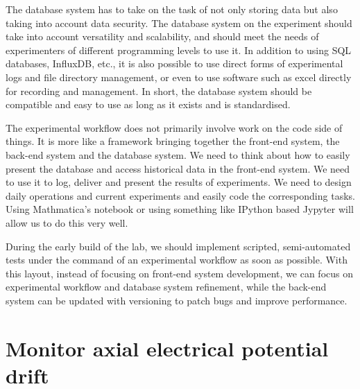The database system has to take on the task of not only storing data but also taking into account data security. The database system on the experiment should take into account versatility and scalability, and should meet the needs of experimenters of different programming levels to use it. In addition to using SQL databases, InfluxDB, etc., it is also possible to use direct forms of experimental logs and file directory management, or even to use software such as excel directly for recording and management. In short, the database system should be compatible and easy to use as long as it exists and is standardised.

The experimental workflow does not primarily involve work on the code side of things. It is more like a framework bringing together the front-end system, the back-end system and the database system. We need to think about how to easily present the database and access historical data in the front-end system. We need to use it to log, deliver and present the results of experiments. We need to design daily operations and current experiments and easily code the corresponding tasks. Using Mathmatica's notebook or using something like IPython based Jypyter will allow us to do this very well.

During the early build of the lab, we should implement scripted, semi-automated tests under the command of an experimental workflow as soon as possible. With this layout, instead of focusing on front-end system development, we can focus on experimental workflow and database system refinement, while the back-end system can be updated with versioning to patch bugs and improve performance.



\section{Monitor axial electrical potential drift}

